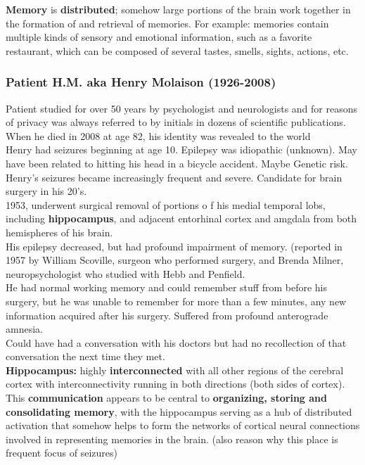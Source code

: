 \documentclass{article}
\begin{document}
\textbf{Memory} is \textbf{distributed}; somehow large portions of the brain work together in the formation of and retrieval of memories. For example: memories contain multiple kinds of sensory and emotional information, such as a favorite restaurant, which can be composed of several tastes, smells, sights, actions, etc. 

\subsubsection{Patient H.M. aka Henry Molaison (1926-2008)}
Patient studied for over 50 years by psychologist and neurologists and for reasons of privacy was always referred to by initials in dozens of scientific publications. When he died in 2008 at age 82, his identity was revealed to the world \\

Henry had seizures beginning at age 10. Epilepsy was idiopathic (unknown). May have been related to hitting his head in a bicycle accident. Maybe Genetic risk. \\
Henry's seizures became increasingly frequent and severe. Candidate for brain surgery in his 20's. \\

1953, underwent surgical removal of portions o f his medial temporal lobs, including \textbf{hippocampus}, and adjacent entorhinal cortex and amgdala from both hemispheres of his brain. \\ 
His epilepsy decreased, but had profound impairment of memory. (reported in 1957 by William Scoville, surgeon who performed surgery, and Brenda Milner, neuropsychologist who studied with Hebb and Penfield. \\ 

He had normal working memory and could remember stuff from before his surgery, but he was unable to remember for more than a few minutes, any new information acquired after his surgery. Suffered from profound anterograde amnesia. \\ 
Could have had a conversation with his doctors but had no recollection of that conversation the next time they met. \\ 

\noindent \textbf{Hippocampus:} highly \textbf{interconnected} with all other regions of the cerebral cortex with interconnectivity running in both directions (both sides of cortex). This \textbf{communication} appears to be central to \textbf{organizing, storing and consolidating memory}, with the hippocampus serving as a hub of distributed activation that somehow helps to form the networks of cortical neural connections involved in representing memories in the brain. (also reason why this place is frequent focus of seizures) 
\end{document}
